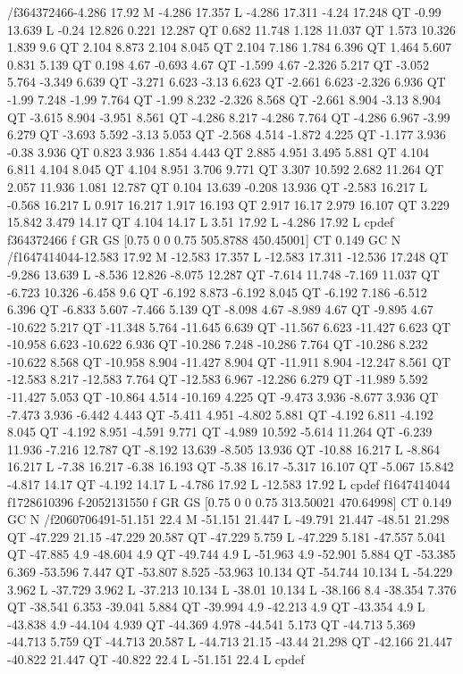 /f364372466{-4.286 17.92 M
-4.286 17.357 L
-4.286 17.311 -4.24 17.248 QT
-0.99 13.639 L
-0.24 12.826 0.221 12.287 QT
0.682 11.748 1.128 11.037 QT
1.573 10.326 1.839 9.6 QT
2.104 8.873 2.104 8.045 QT
2.104 7.186 1.784 6.396 QT
1.464 5.607 0.831 5.139 QT
0.198 4.67 -0.693 4.67 QT
-1.599 4.67 -2.326 5.217 QT
-3.052 5.764 -3.349 6.639 QT
-3.271 6.623 -3.13 6.623 QT
-2.661 6.623 -2.326 6.936 QT
-1.99 7.248 -1.99 7.764 QT
-1.99 8.232 -2.326 8.568 QT
-2.661 8.904 -3.13 8.904 QT
-3.615 8.904 -3.951 8.561 QT
-4.286 8.217 -4.286 7.764 QT
-4.286 6.967 -3.99 6.279 QT
-3.693 5.592 -3.13 5.053 QT
-2.568 4.514 -1.872 4.225 QT
-1.177 3.936 -0.38 3.936 QT
0.823 3.936 1.854 4.443 QT
2.885 4.951 3.495 5.881 QT
4.104 6.811 4.104 8.045 QT
4.104 8.951 3.706 9.771 QT
3.307 10.592 2.682 11.264 QT
2.057 11.936 1.081 12.787 QT
0.104 13.639 -0.208 13.936 QT
-2.583 16.217 L
-0.568 16.217 L
0.917 16.217 1.917 16.193 QT
2.917 16.17 2.979 16.107 QT
3.229 15.842 3.479 14.17 QT
4.104 14.17 L
3.51 17.92 L
-4.286 17.92 L
cp}def
f364372466
f
GR
GS
[0.75 0 0 0.75 505.8788 450.45001] CT
0.149 GC
N
/f1647414044{-12.583 17.92 M
-12.583 17.357 L
-12.583 17.311 -12.536 17.248 QT
-9.286 13.639 L
-8.536 12.826 -8.075 12.287 QT
-7.614 11.748 -7.169 11.037 QT
-6.723 10.326 -6.458 9.6 QT
-6.192 8.873 -6.192 8.045 QT
-6.192 7.186 -6.512 6.396 QT
-6.833 5.607 -7.466 5.139 QT
-8.098 4.67 -8.989 4.67 QT
-9.895 4.67 -10.622 5.217 QT
-11.348 5.764 -11.645 6.639 QT
-11.567 6.623 -11.427 6.623 QT
-10.958 6.623 -10.622 6.936 QT
-10.286 7.248 -10.286 7.764 QT
-10.286 8.232 -10.622 8.568 QT
-10.958 8.904 -11.427 8.904 QT
-11.911 8.904 -12.247 8.561 QT
-12.583 8.217 -12.583 7.764 QT
-12.583 6.967 -12.286 6.279 QT
-11.989 5.592 -11.427 5.053 QT
-10.864 4.514 -10.169 4.225 QT
-9.473 3.936 -8.677 3.936 QT
-7.473 3.936 -6.442 4.443 QT
-5.411 4.951 -4.802 5.881 QT
-4.192 6.811 -4.192 8.045 QT
-4.192 8.951 -4.591 9.771 QT
-4.989 10.592 -5.614 11.264 QT
-6.239 11.936 -7.216 12.787 QT
-8.192 13.639 -8.505 13.936 QT
-10.88 16.217 L
-8.864 16.217 L
-7.38 16.217 -6.38 16.193 QT
-5.38 16.17 -5.317 16.107 QT
-5.067 15.842 -4.817 14.17 QT
-4.192 14.17 L
-4.786 17.92 L
-12.583 17.92 L
cp}def
f1647414044
f1728610396
f-2052131550
f
GR
GS
[0.75 0 0 0.75 313.50021 470.64998] CT
0.149 GC
N
/f2060706491{-51.151 22.4 M
-51.151 21.447 L
-49.791 21.447 -48.51 21.298 QT
-47.229 21.15 -47.229 20.587 QT
-47.229 5.759 L
-47.229 5.181 -47.557 5.041 QT
-47.885 4.9 -48.604 4.9 QT
-49.744 4.9 L
-51.963 4.9 -52.901 5.884 QT
-53.385 6.369 -53.596 7.447 QT
-53.807 8.525 -53.963 10.134 QT
-54.744 10.134 L
-54.229 3.962 L
-37.729 3.962 L
-37.213 10.134 L
-38.01 10.134 L
-38.166 8.4 -38.354 7.376 QT
-38.541 6.353 -39.041 5.884 QT
-39.994 4.9 -42.213 4.9 QT
-43.354 4.9 L
-43.838 4.9 -44.104 4.939 QT
-44.369 4.978 -44.541 5.173 QT
-44.713 5.369 -44.713 5.759 QT
-44.713 20.587 L
-44.713 21.15 -43.44 21.298 QT
-42.166 21.447 -40.822 21.447 QT
-40.822 22.4 L
-51.151 22.4 L
cp}def
